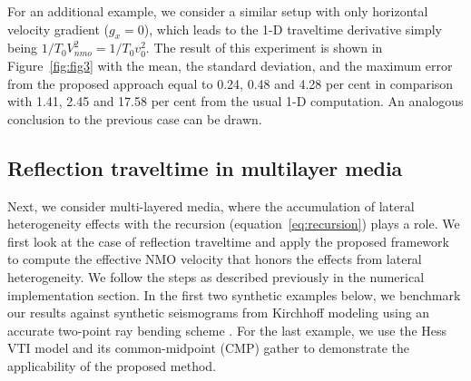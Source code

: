 
For an additional example, we consider a similar setup with only horizontal velocity gradient ($g_x=0$), which leads to the 1-D traveltime derivative simply being $1\big/T_0 V^2_{nmo} = 1\big/T_0 v^2_{0}$. The result of this experiment is shown in Figure~\ref{fig:fig3} with the mean, the standard deviation, and the maximum error from the proposed approach equal to 0.24, 0.48 and 4.28 per cent in comparison with 1.41, 2.45 and 17.58 per cent from the usual 1-D computation. An analogous conclusion to the previous case can be drawn.


\subsection{Reflection traveltime in multilayer media}
Next, we consider multi-layered media, where the accumulation of lateral heterogeneity effects with the recursion (equation~\ref{eq:recursion}) plays a role. We first look at the case of reflection traveltime and apply the proposed framework to compute the effective NMO velocity that honors the effects from lateral heterogeneity. We follow the steps as described previously in the numerical implementation section. In the first two synthetic examples below, we benchmark our results against synthetic seismograms from Kirchhoff modeling using an accurate two-point ray bending scheme \cite[]{zonetwopoint}. For the last example, we use the Hess VTI model and its common-midpoint (CMP) gather to demonstrate the applicability of the proposed method.



